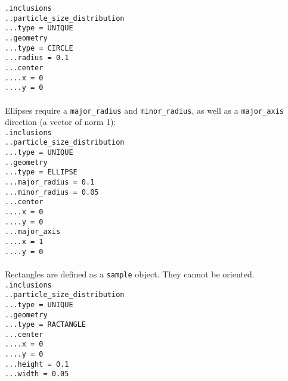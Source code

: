 \documentclass[10pt]{article}
\begin{document}
\noindent \verb+.inclusions+\\
\verb+..particle_size_distribution+\\
\verb+...type = UNIQUE+\\
\verb+..geometry+\\
\verb+...type = CIRCLE+\\
\verb+...radius = 0.1+\\
\verb+...center+\\
\verb+....x = 0+\\
\verb+....y = 0+

\paragraph{}Ellipses require a \verb+major_radius+ and \verb+minor_radius+, as well as a \verb+major_axis+ direction (a vector of norm 1):\\

\noindent \verb+.inclusions+\\
\verb+..particle_size_distribution+\\
\verb+...type = UNIQUE+\\
\verb+..geometry+\\
\verb+...type = ELLIPSE+\\
\verb+...major_radius = 0.1+\\
\verb+...minor_radius = 0.05+\\
\verb+...center+\\
\verb+....x = 0+\\
\verb+....y = 0+\\
\verb+...major_axis+\\
\verb+....x = 1+\\
\verb+....y = 0+

\paragraph{}Rectangles are defined as a \verb+sample+ object. They cannot be oriented.\\

\noindent \verb+.inclusions+\\
\verb+..particle_size_distribution+\\
\verb+...type = UNIQUE+\\
\verb+..geometry+\\
\verb+...type = RACTANGLE+\\
\verb+...center+\\
\verb+....x = 0+\\
\verb+....y = 0+\\
\verb+...height = 0.1+\\
\verb+...width = 0.05+
\end{document}
